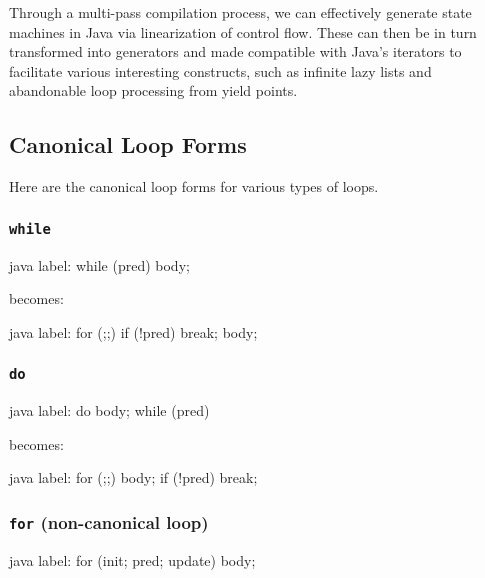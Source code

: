 \documentclass[journal,a4paper]{IEEEtran}
\begin{document}
Through a multi-pass compilation process, we can effectively generate state machines in Java via
linearization of control flow. These can then be in turn transformed into generators and made
compatible with Java's iterators to facilitate various interesting constructs, such as infinite
lazy lists and abandonable loop processing from yield points.

\appendix
\subsection{Canonical Loop Forms} \label{appendix:canonical-loop-forms}

Here are the canonical loop forms for various types of loops.

\subsubsection{\texttt{while}}

\begin{pygmented}{java}
label: while (pred) {
    body;
}
\end{pygmented}

becomes:

\begin{pygmented}{java}
label: for (;;) {
    if (!pred) break; body;
}
\end{pygmented}

\subsubsection{\texttt{do}}

\begin{pygmented}{java}
label: do {
    body;
} while (pred)
\end{pygmented}

becomes:

\begin{pygmented}{java}
label: for (;;) {
    body; if (!pred) break;
}
\end{pygmented}

\subsubsection{\texttt{for} (non-canonical loop)}

\begin{pygmented}{java}
label: for (init; pred; update) {
    body;
}
\end{pygmented}
\end{document}
